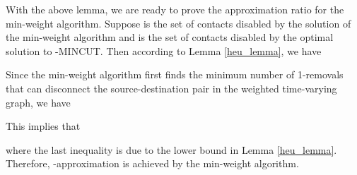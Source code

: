 \documentclass[10pt, conference, letterpaper]{IEEEtran}
\begin{document}
With the above lemma, we are ready to prove the approximation ratio for the min-weight algorithm. Suppose  is the set of contacts disabled by the solution of the min-weight algorithm and  is the set of contacts disabled by the optimal solution to -MINCUT. Then according to Lemma \ref{heu_lemma}, we have

Since the min-weight algorithm first finds the minimum number of 1-removals that can disconnect the source-destination pair in the weighted time-varying graph, we have

This implies that

where the last inequality is due to the lower bound in Lemma \ref{heu_lemma}. Therefore, -approximation is achieved by the min-weight algorithm.
\end{document}
